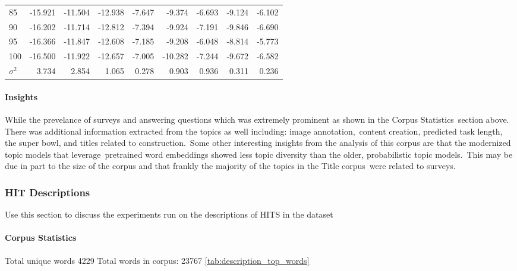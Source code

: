 \documentclass[letterpaper,12pt]{article}
\begin{document}
\begin{table}
\begin{center}
\begin{tabular}{|l|rr|rr|rr|rr|}
			85  & -15.921 & -11.504 & -12.938 & -7.647 &  -9.374 & -6.693 & -9.124 & -6.102 \\
			90  & -16.202 & -11.714 & -12.812 & -7.394 &  -9.924 & -7.191 & -9.846 & -6.690 \\
			95  & -16.366 & -11.847 & -12.608 & -7.185 &  -9.208 & -6.048 & -8.814 & -5.773 \\
			100 & -16.500 & -11.922 & -12.657 & -7.005 & -10.282 & -7.244 & -9.672 & -6.582 \\
			\hline
			$\sigma^2$ & 3.734 & 2.854 & 1.065 & 0.278 & 0.903 & 0.936 & 0.311 & 0.236 \\
			\hline
		\end{tabular}
	\end{center}
\end{table}

\newpage
\paragraph{Insights}
While the prevelance of surveys and answering questions which was extremely prominent as shown in the Corpus Statistics\
section above. There was additional information extracted from the topics as well including: image annotation,\
content creation, predicted task length, the super bowl, and titles related to construction.\
Some other interesting insights from the analysis of this corpus are that the modernized topic models that leverage\
pretrained word embeddings showed less topic diversity than the older, probabilistic topic models.\
This may be due in part to the size of the corpus and that frankly the majority of the topics in the Title corpus\
were related to surveys.

\subsubsection{HIT Descriptions}
Use this section to discuss the experiments run on the descriptions of HITS in the dataset

\paragraph{Corpus Statistics}
Total unique words 4229
Total words in corpus: 23767
\ref{tab:description_top_words}
\end{document}
